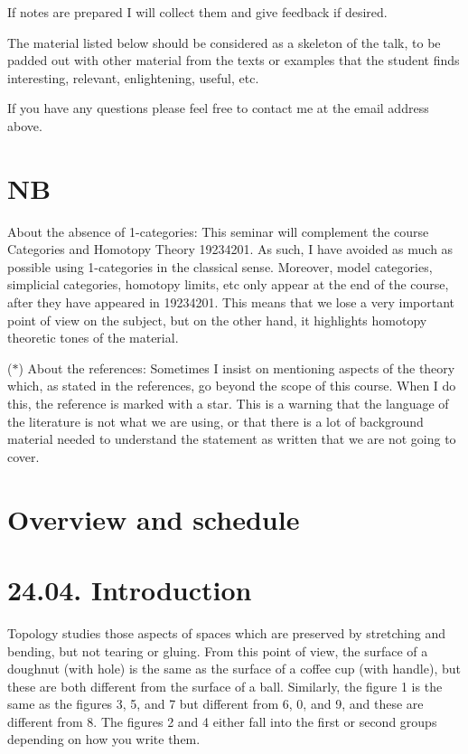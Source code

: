 \documentclass[a4paper]{amsart}
\numberwithin{figure}{section}
\theoremstyle{theorem}
\theoremstyle{definition}
\begin{document}
If notes are prepared I will collect them and give feedback if desired.

The material listed below should be considered as a skeleton of the talk, to be padded out with other material from the texts or examples that the student finds interesting, relevant, enlightening, useful, etc.

If you have any questions please feel free to contact me at the email address above.

\section*{NB}

About the absence of 1-categories: This seminar will complement the course Categories and Homotopy Theory 19234201. As such, I have avoided as much as possible using 1-categories in the classical sense. Moreover, model categories, simplicial categories, homotopy limits, etc only appear at the end of the course, after they have appeared in 19234201. This means that we lose a very important point of view on the subject, but on the other hand, it highlights homotopy theoretic tones of the material.

($*$) About the references: Sometimes I insist on mentioning aspects of the theory which, as stated in the references, go beyond the scope of this course. When I do this, the reference is marked with a star. This is a warning that the language of the literature is not what we are using, or that there is a lot of background material needed to understand the statement as written that we are not going to cover.

\section*{Overview and schedule}

\section{24.04. Introduction}

Topology studies those aspects of spaces which are preserved by stretching and bending, but not tearing or gluing. From this point of view, the surface of a doughnut (with hole) is the same as the surface of a coffee cup (with handle), but these are both different from the surface of a ball. Similarly, the figure 1 is the same as the figures 3, 5, and 7 but different from 6, 0, and 9, and these are different from 8. The figures 2 and 4 either fall into the first or second groups depending on how you write them.
\end{document}
